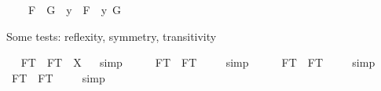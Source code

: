 \begin{isabellebody}
\ \ \ \ {\isachardoublequoteopen}F{}\ \isactrlbold {\isacharequal}\ G{}\ {\isasymequiv}\ {\isacharparenleft}\isactrlbold {\isasymlambda}y\ {\isachardot}\ F{}{\isacharparenright}\ \isactrlbold {\isacharequal}\ {\isacharparenleft}\isactrlbold {\isasymlambda}y{\isachardot}\ G{}{\isacharparenright}{\isachardoublequoteclose}%
\begin{isamarkuptext}%
Some tests: reflexity, symmetry, transitivity%
\end{isamarkuptext}%
\isamarkuptrue%
\ \isamarkupfalse%
\ {\isachardoublequoteopen}F{}\isactrlsup T\ \isactrlbold {\isacharequal}\ F{}\isactrlsup T\ {\isacharequal}\ X{\isachardoublequoteclose}%
\isadelimproof
\ %
\endisadelimproof
%
\isatagproof
{}\isamarkupfalse%
\ simp\ \isamarkupfalse%
\ %
%
\endisatagproof
{\isafoldproof}%
%
\isadelimproof
%
\endisadelimproof
\isanewline
\ \isamarkupfalse%
\ {\isachardoublequoteopen}{\isacharbrackleft}F{}\isactrlsup T\ \isactrlbold {\isacharequal}\ F{}\isactrlsup T{\isacharbrackright}\ {\isacharequal}\ {\isasymtop}{\isachardoublequoteclose}%
\isadelimproof
\ %
\endisadelimproof
%
\isatagproof
{}\isamarkupfalse%
\ simp\ \isamarkupfalse%
%
\endisatagproof
{\isafoldproof}%
%
\isadelimproof
%
\endisadelimproof
\ \isanewline
\ \isamarkupfalse%
\ {\isachardoublequoteopen}{\isacharbrackleft}F{}\isactrlsup T\ \isactrlbold {\isacharequal}\ F{}\isactrlsup T{\isacharbrackright}\ {\isacharequal}\ {\isasymtop}{\isachardoublequoteclose}%
\isadelimproof
\ %
\endisadelimproof
%
\isatagproof
{}\isamarkupfalse%
\ simp\ \isamarkupfalse%
%
\endisatagproof
{\isafoldproof}%
%
\isadelimproof
%
\endisadelimproof
\isanewline
\ \isamarkupfalse%
\ {\isachardoublequoteopen}{\isacharbrackleft}F{}\isactrlsup T\ \isactrlbold {\isacharequal}\ F{}\isactrlsup T{\isacharbrackright}\ {\isacharequal}\ {\isasymtop}{\isachardoublequoteclose}%
\isadelimproof
\ %
\endisadelimproof
%
\isatagproof
{}\isamarkupfalse%
\ simp\ \isamarkupfalse%
%
\endisatagproof
{\isafoldproof}%

\end{isabellebody}
